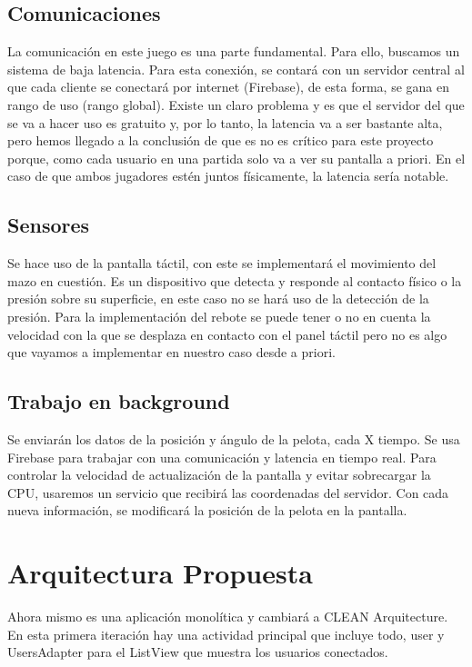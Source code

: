 \documentclass[a4paper,openright,12pt]{article}
\begin{document}
\subsection{Comunicaciones}
La comunicación en este juego es una parte fundamental. Para ello, buscamos un sistema de baja latencia. Para esta conexión, se contará con un servidor central al que cada cliente se conectará por internet (Firebase), de esta forma, se gana en rango de uso (rango global). Existe un claro problema y es que el servidor del que se va a hacer uso es gratuito y, por lo tanto, la latencia va a ser bastante alta, pero hemos llegado a la conclusión de que es no es crítico para este proyecto porque, como cada usuario en una partida solo va a ver su pantalla a priori. En el caso de que ambos jugadores estén juntos físicamente, la latencia sería notable.

\subsection{Sensores}
Se hace uso de la pantalla táctil, con este se implementará el movimiento del mazo en cuestión. Es un dispositivo que detecta y responde al contacto físico o la presión sobre su superficie, en este caso no se hará uso de la detección de la presión. Para la implementación del rebote se puede tener o no en cuenta la velocidad con la que se desplaza en contacto con el panel táctil pero no es algo que vayamos a implementar en nuestro caso desde a priori.
\subsection{Trabajo en background}
Se enviarán los datos de la posición y ángulo de la pelota, cada X tiempo. Se usa Firebase para trabajar con una comunicación y latencia en tiempo real. Para controlar la velocidad de actualización de la pantalla y evitar sobrecargar la CPU, usaremos un servicio que recibirá las coordenadas del servidor. Con cada nueva información, se modificará la posición de la pelota en la pantalla.

\section{Arquitectura Propuesta}
Ahora mismo es una aplicación monolítica y cambiará a CLEAN Arquitecture. En esta primera iteración hay una actividad principal que incluye todo, user y UsersAdapter para el ListView que muestra los usuarios conectados. 
\end{document}
